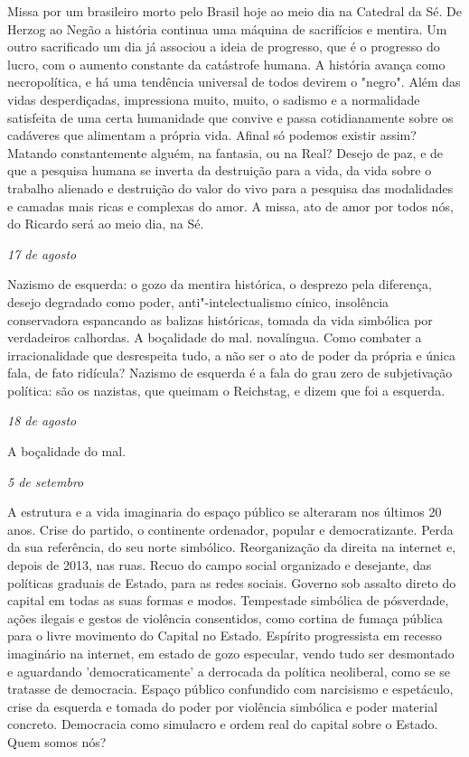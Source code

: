 Missa por um brasileiro morto pelo Brasil hoje ao meio dia na Catedral
da Sé. De Herzog ao Negão a história continua uma máquina de sacrifícios
e mentira. Um outro sacrificado um dia já associou a ideia de progresso,
que é o progresso do lucro, com o aumento constante da catástrofe
humana. A história avança como necropolítica, e há uma tendência
universal de todos devirem o "negro". Além das vidas desperdiçadas,
impressiona muito, muito, o sadismo e a normalidade satisfeita de uma
certa humanidade que convive e passa cotidianamente sobre os cadáveres
que alimentam a própria vida. Afinal só podemos existir assim? Matando
constantemente alguém, na fantasia, ou na Real? Desejo de paz, e de que
a pesquisa humana se inverta da destruição para a vida, da vida sobre o
trabalho alienado e destruição do valor do vivo para a pesquisa das
modalidades e camadas mais ricas e complexas do amor. A missa, ato de
amor por todos nós, do Ricardo será ao meio dia, na Sé.

\begin{flushright}
\emph{17 de agosto}
\end{flushright}

Nazismo de esquerda: o gozo da mentira histórica, o desprezo pela
diferença, desejo degradado como poder, anti"-intelectualismo cínico,
insolência conservadora espancando as balizas históricas, tomada da vida
simbólica por verdadeiros calhordas. A boçalidade do mal. novalíngua.
Como combater a irracionalidade que desrespeita tudo, a não ser o ato de
poder da própria e única fala, de fato ridícula? Nazismo de esquerda é a
fala do grau zero de subjetivação política: são os nazistas, que queimam
o Reichstag, e dizem que foi a esquerda.

\begin{flushright}
\emph{18 de agosto}
\end{flushright}

A boçalidade do mal.

\begin{flushright}
\emph{5 de setembro}
\end{flushright}

A estrutura e a vida imaginaria do espaço público se alteraram nos
últimos 20 anos. Crise do partido, o continente ordenador, popular e
democratizante. Perda da sua referência, do seu norte simbólico.
Reorganização da direita na internet e, depois de 2013, nas ruas. Recuo
do campo social organizado e desejante, das políticas graduais de
Estado, para as redes sociais. Governo sob assalto direto do capital em
todas as suas formas e modos. Tempestade simbólica de pósverdade, ações
ilegais e gestos de violência consentidos, como cortina de fumaça
pública para o livre movimento do Capital no Estado. Espírito
progressista em recesso imaginário na internet, em estado de gozo
especular, vendo tudo ser desmontado e aguardando 'democraticamente' a
derrocada da política neoliberal, como se se tratasse de democracia.
Espaço público confundido com narcisismo e espetáculo, crise da esquerda
e tomada do poder por violência simbólica e poder material concreto.
Democracia como simulacro e ordem real do capital sobre o Estado. Quem
somos nós?

